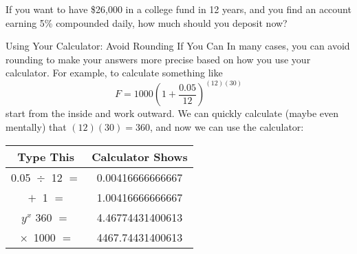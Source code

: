 \begin{try}
If you want to have \$26,000 in a college fund in 12 years, and you find an account earning 5\% compounded daily, how much should you deposit now?
\end{try}
\vfill
\text{}
\vfill
\pagebreak
\text{}
\vfill

\begin{proc}{Using Your Calculator: Avoid Rounding If You Can}
In many cases, you can avoid rounding to make your answers more precise based on how you use your calculator.  For example, to calculate something like
\[F = 1000\left(1+\dfrac{0.05}{12}\right)^{(12)(30)}\] start from the inside and work outward.  We can quickly calculate (maybe even mentally) that $(12)(30) = 360$, and now we can use the calculator:
\begin{center}
\begin{tabular}{c | c}
\textbf{Type This} & \textbf{Calculator Shows}\\
\hline
0.05 $\boxed{\div}$ 12 $\boxed{=}$ & 0.00416666666667\\
$\boxed{+}$ 1 $\boxed{=}$ & 1.00416666666667\\
$\boxed{y^x}$ 360 $\boxed{=}$ & 4.46774431400613\\
$\boxed{\times}$ 1000 $\boxed{=}$ & 4467.74431400613
\end{tabular}
\end{center}
\end{proc}
\vfill

